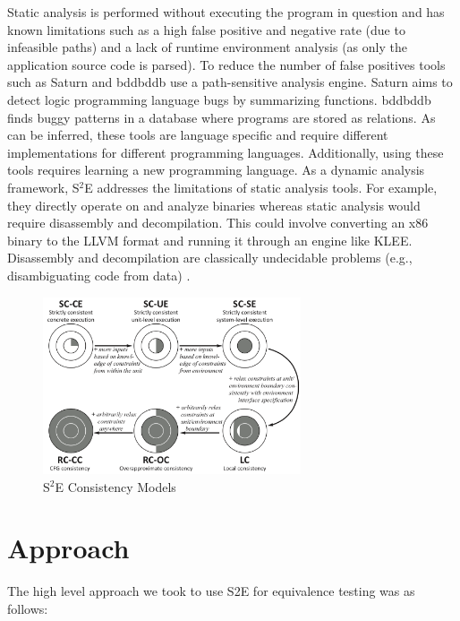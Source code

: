\documentclass[conference]{IEEEtran}
\begin{document}
Static analysis is performed without executing the program in question and has known limitations such as a high false positive and negative rate (due to infeasible paths) \cite{sage} and a lack of runtime environment analysis (as only the application source code is parsed). To reduce the number of false positives tools such as Saturn \cite{saturn} and bddbddb \cite{bddbddb} use a path-sensitive analysis engine. Saturn aims to detect logic programming language bugs by summarizing functions. bddbddb finds buggy patterns in a database where programs are stored as relations. As can be inferred, these tools are language specific and require different implementations for different programming languages. Additionally, using these tools requires learning a new programming language. As a dynamic analysis framework, S$^2$E addresses the limitations of static analysis tools. For example, they directly operate on and analyze binaries whereas static analysis would require disassembly and decompilation. This could involve converting an x86 binary to the LLVM format and running it through an engine like KLEE. Disassembly and decompilation \cite{disassembly} are classically undecidable problems (e.g., disambiguating code from data) \cite{s2e}.

\begin{figure}[!t]
\centering
\includegraphics[width=3in]{s2e-consistency-models.png}
\caption{S$^2$E Consistency Models \cite{s2e}}
\label{s2e-cm}
\end{figure}


\section{Approach}

The high level approach we took to use S2E for equivalence testing was as follows:
\end{document}
